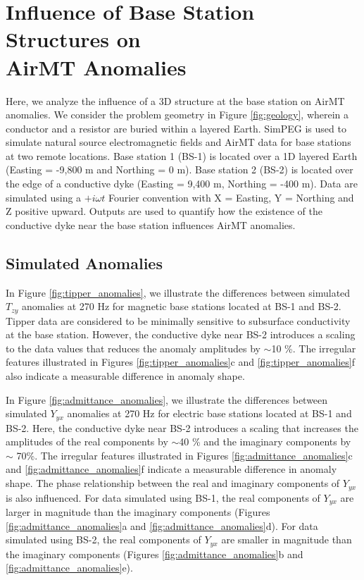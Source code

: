 \documentclass{segabs}
\begin{document}
\vspace{-12pt}
\section{Influence of Base Station Structures on \\AirMT Anomalies}
\vspace{-8pt}
\label{sec:anomalies}
Here, we analyze the influence of a 3D structure at the base station on AirMT anomalies. We consider the problem geometry in Figure \ref{fig:geology}, wherein a conductor and a resistor are buried within a layered Earth. SimPEG \citep{Cockett2015} is used to simulate natural source electromagnetic fields and AirMT data for base stations at two remote locations. Base station 1 (BS-1) is located over a 1D layered Earth (Easting = -9,800 m and Northing = 0 m). Base station 2 (BS-2) is located over the edge of a conductive dyke (Easting = 9,400 m, Northing = -400 m). Data are simulated using a $+i\omega t$ Fourier convention with X = Easting, Y = Northing and Z positive upward. Outputs are used to quantify how the existence of the conductive dyke near the base station influences AirMT anomalies.

\subsection{Simulated Anomalies}
\label{sec:anomalies}
\vspace{-8pt}

In Figure \ref{fig:tipper_anomalies}, we illustrate the differences between simulated $T_{zy}$ anomalies at 270 Hz for magnetic base stations located at BS-1 and BS-2. Tipper data are considered to be minimally sensitive to subsurface conductivity at the base station. However, the conductive dyke near BS-2 introduces a scaling to the data values that reduces the anomaly amplitudes by $\sim$10 \%. The irregular features illustrated in Figures \ref{fig:tipper_anomalies}c and \ref{fig:tipper_anomalies}f also indicate a measurable difference in anomaly shape.

In Figure \ref{fig:admittance_anomalies}, we illustrate the differences between simulated $Y_{yx}$ anomalies at 270 Hz for electric base stations located at BS-1 and BS-2. Here, the conductive dyke near BS-2 introduces a scaling that increases the amplitudes of the real components by $\sim$40 \% and the imaginary components by $\sim$ 70\%. The irregular features illustrated in Figures \ref{fig:admittance_anomalies}c and \ref{fig:admittance_anomalies}f indicate a measurable difference in anomaly shape. The phase relationship between the real and imaginary components of $Y_{yx}$ is also influenced. For data simulated using BS-1, the real components of $Y_{yx}$ are larger in magnitude than the imaginary components (Figures \ref{fig:admittance_anomalies}a and \ref{fig:admittance_anomalies}d). For data simulated using BS-2, the real components of $Y_{yx}$ are smaller in magnitude than the imaginary components (Figures \ref{fig:admittance_anomalies}b and \ref{fig:admittance_anomalies}e).
\end{document}
